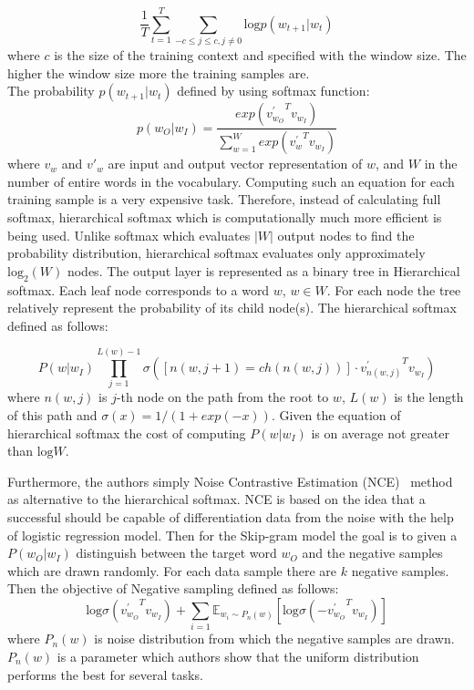 \begin{itemize}
\begin{equation}
\frac{1}{T}\sum_{t=1}^{T}\sum_{-c \leq j\leq c, j\neq0 } \textrm{log} p(w_{t+1}|w_{t})
\end{equation}
where $c$ is the size of the training context and specified with the window size. The higher the window size more the training samples are. \\
The probability $p(w_{t+1}|w_{t})$ defined by using softmax function: 
\begin{equation}
p(w_{O}|w_{I})=\frac{exp({v^{'}_{w_O}}^{T} {v}_{w_{I}})}{\sum\limits_{w=1}^{W} exp({v^{'}_w}^{T} {v}_{w_{I}})}
\end{equation}
where $v_w$ and $v'_w$ are input and output vector representation of $w$, and $W$ in the number of entire words in the vocabulary. Computing such an equation for each training sample is a very expensive task. Therefore, instead of calculating full softmax, hierarchical softmax which is computationally much more efficient is being used. Unlike softmax which evaluates $|W|$ output nodes to find the probability distribution, hierarchical softmax evaluates only approximately $\textrm{log}_2(W)$ nodes. The output layer is represented as a binary tree in Hierarchical softmax. Each leaf node corresponds to a word $w$, $w \in W$. For each node the tree relatively represent the probability of its child node(s). The hierarchical softmax defined as follows:

\begin{equation}
\displaystyle P(w|w_I) \prod_{j=1}^{L(w)-1} \sigma([n(w,j+1)=ch(n(w,j))]\cdot {v^{'}_{n(w,j)}}^{T} {v}_{w_{I}} )  
\end{equation}
where $n(w,j)$ is $j$-th node on the path from the root to $w$, $L(w)$ is the length of this path and $\sigma(x)=1/(1+exp(-x))$. Given the equation of hierarchical softmax the cost of computing $P(w|w_I)$ is on average not greater than $\textrm{log}W$.

Furthermore, the authors simply Noise Contrastive Estimation (NCE)~\cite{cite} method as alternative to the hierarchical softmax. NCE is based on the idea that a successful should be capable of differentiation data from the noise with the help of logistic regression model. Then for the Skip-gram model  the goal is to given a $P(w_O|w_I)$ distinguish between the target word $w_O$ and the negative samples which are drawn randomly. For each data sample there are $k$ negative samples. Then the objective of Negative sampling defined as follows: 
\begin{equation}
 \textrm{log}\sigma({v^{'}_{w_O}}^{T} {v}_{w_{I}} )+ \sum_{i=1 }\mathbb{E}_{w_i\sim P_n(w)}\left[ \textrm{log}\sigma({- v^{'}_{w_O}}^{T} {v}_{w_{I}} ) \right] 
\end{equation}
where $P_n(w)$ is noise distribution from which the negative samples are drawn. $P_n(w)$ is a parameter which authors show that the uniform distribution performs the best for several tasks.


\end{itemize}
